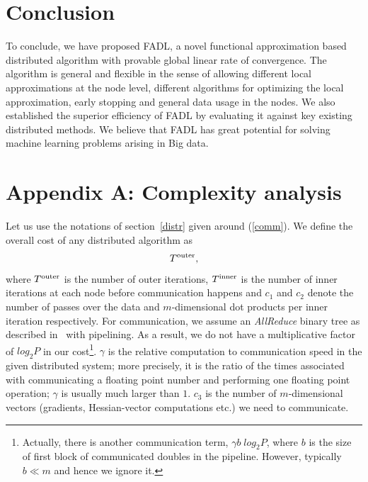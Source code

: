 \documentclass[twoside, 11pt]{article}
\begin{document}
\section{Conclusion}
\label{conc}

To conclude, we have proposed FADL, a novel functional approximation based distributed algorithm with provable global linear rate of convergence. The algorithm is general and flexible in the
sense of allowing different local approximations at the node level, different algorithms for optimizing the local approximation, early stopping and general data usage in the nodes. We also established the superior efficiency of FADL by evaluating it against key existing distributed methods. We believe that FADL has great potential for solving machine learning problems arising in Big data.




\appendix

%

\def\C{C}
\def\Ccomp{C^{\rm Comp}}
\def\Ccomm{C^{\rm Comm}}
\def\Csqm{C_{\rm SQM}}
\def\Cfadl{C_{\rm FADL}}
\def\Ccompsqm{C^{\rm Comp}_{\rm SQM}}
\def\Ccommsqm{C^{\rm Comm}_{\rm SQM}}
\def\Ccompfadl{C^{\rm Comp}_{\rm FADL}}
\def\Ccommfadl{C^{\rm Comm}_{\rm FADL}}
\def\Tout{T^{\rm outer}}
\def\Tin{T^{\rm inner}}
\def\Toutsqm{T^{\rm outer}_{\rm SQM}}
\def\Toutour{T^{\rm outer}_{\rm FADL}}

\section*{Appendix A: Complexity analysis}
\label{proofs}
Let us use the notations of section~\ref{distr} given around (\ref{comm}). We define the overall cost of any distributed algorithm as
\begin{eqnarray}
[(c_1\frac{nz}{P} + c_2m)\Tin + c_3 \gamma m]\Tout,
\label{costanal}
\end{eqnarray}
where $\Tout$ is the number of outer iterations, $\Tin$ is the number of inner iterations at each node before communication happens and  $c_1$ and $c_2$ denote the number of passes over the data and $m$-dimensional dot products per inner iteration respectively. For communication, we assume an {\it AllReduce} binary tree as described in~\citet{agarwal2011} with pipelining. As a result, we do not have a multiplicative factor of $log_2 P$ in our cost\footnote{Actually, there is another communication term, $\gamma b\; log_2 P$, where $b$ is the size of first block of communicated doubles in the pipeline. However, typically $b\ll m$ and hence we ignore it.}. $\gamma$ is the relative computation to communication speed in the given distributed system; more precisely, it is the ratio of the times associated with communicating a floating point number and performing one floating point operation; $\gamma$ is usually much larger than $1$.
$c_3$ is the number of $m$-dimensional vectors (gradients, Hessian-vector computations etc.) we need to communicate.
\end{document}
